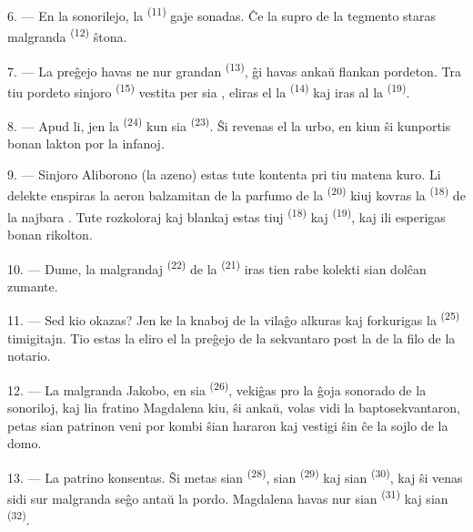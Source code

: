 6. --- En la sonorilejo, la  \textsuperscript{(11)} gaje
sonadas. Ĉe la supro de la tegmento staras malgranda 
\textsuperscript{(12)} ŝtona.

7. --- La preĝejo havas ne nur grandan 
\textsuperscript{(13)}, ĝi havas ankaŭ flankan pordeton. Tra tiu pordeto sinjoro
 \textsuperscript{(15)} vestita per sia ,
eliras el la  \textsuperscript{(14)} kaj iras al la
 \textsuperscript{(19)}.

8. --- Apud li, jen la  \textsuperscript{(24)} kun sia
 \textsuperscript{(23)}. Ŝi revenas el la urbo, en kiun ŝi
kunportis bonan lakton por la infanoj.

\VUsaut{4.0mm}
\VUsaut{3.4mm}

9. --- Sinjoro Aliborono (la azeno) estas tute kontenta pri tiu matena kuro.
Li delekte enspiras la aeron balzamitan de la parfumo de la 
\textsuperscript{(20)} kiuj kovras la 
\textsuperscript{(18)} de la najbara . Tute rozkoloraj
kaj blankaj estas tiuj  \textsuperscript{(18)} kaj
 \textsuperscript{(19)}, kaj ili esperigas bonan rikolton.

10. --- Dume, la malgrandaj  \textsuperscript{(22)} de la
 \textsuperscript{(21)} iras tien rabe kolekti sian dolĉan
 zumante.

11. --- Sed kio okazas? Jen ke la knaboj de la vilaĝo alkuras kaj forkurigas
la  \textsuperscript{(25)} timigitajn. Tio estas la eliro el
la preĝejo de la sekvantaro post la  de la filo de la notario.

12. --- La malgranda Jakobo, en sia  \textsuperscript{(26)},
vekiĝas pro la ĝoja sonorado de la sonoriloj, kaj lia fratino Magdalena kiu,
ŝi ankaŭ, volas vidi la baptosekvantaron, petas sian patrinon veni por kombi
ŝian hararon kaj vestigi ŝin ĉe la sojlo de la domo.

13. --- La patrino konsentas. Ŝi metas sian 
\textsuperscript{(28)}, sian  \textsuperscript{(29)} kaj sian
 \textsuperscript{(30)}, kaj ŝi venas sidi sur malgranda
seĝo antaŭ la pordo. Magdalena havas nur sian 
\textsuperscript{(31)} kaj sian  \textsuperscript{(32)}.

